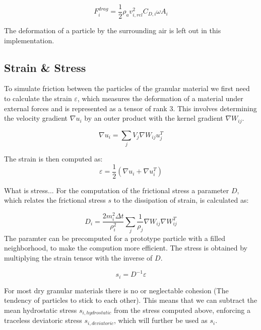 \documentclass[intern]{cgMA}
\begin{document}
    \begin{equation}
        F^{drag}_i = \frac{1}{2}\rho_a v^2_{i,rel} C_{D,i}  \omega  A_i
    \end{equation}

    The deformation of a particle by the surrounding air is left out in this implementation.

    \subsection{Strain \& Stress}
    
    To simulate friction between the particles of the granular material we first need to calculate the strain $\varepsilon$, which measures the deformation of a material under external forces and is represented as a tensor of rank 3. This involves determining the velocity gradient $\nabla u_i$ by an outer product with the kernel gradient $\nabla W_{ij}$. 
    
    \begin{equation}
        \nabla u_i = \sum_j V_j \nabla W_{ij} u_j^T
    \end{equation}

    The strain is then computed as:
    \begin{equation}
        \varepsilon = \frac{1}{2} (\nabla u_i + \nabla u_i^T)
    \end{equation}

    What is stress...
    For the computation of the frictional stress a parameter $D$, which relates the frictional stress $s$ to the dissipation of strain, is calculated as:

    \begin{equation}
        D_i = \frac{2 m_i^2 \Delta t}{\rho_i^2} \sum_j \frac{1}{\rho_j} \nabla W_{ij}  \nabla W_{ij}^T
    \end{equation}
    The paramter can be precomputed for a prototype particle with a filled neighborhood, to make the compution more efficient.
    The stress is obtained by multiplying the strain tensor with the inverse of $D$. 
    
    \begin{equation}
        s_i = D^{-1} \varepsilon
    \end{equation}

    For most dry granular materials there is no or neglectable cohesion (The tendency of particles to stick to each other). This means that we can subtract the mean hydrostatic stress $s_{i, hydrostatic}$ from the stress computed above, enforcing a traceless deviatoric stress $s_{i, deviatoric}$, which will further be used as $s_i$. 
\end{document}
